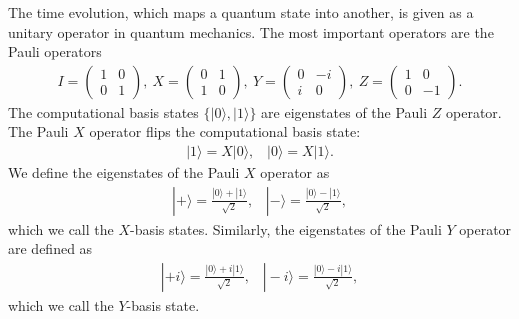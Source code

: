 The time evolution, which maps a quantum state into another, is given as a unitary operator in quantum mechanics.
The most important operators are the Pauli operators
\begin{eqnarray}
I
=
\left(
\begin{array}{cc}
1 & 0
\\
0 & 1
\end{array}
\right),\ 
X
=
\left(
\begin{array}{cc}
0 & 1
\\
1 & 0
\end{array}
\right),\ 
Y
=
\left(
\begin{array}{cc}
0 & -i
\\
i & 0
\end{array}
\right),\ 
Z
=
\left(
\begin{array}{cc}
1 & 0
\\
0 & -1
\end{array}
\right).
\end{eqnarray}
The computational basis states $\{ |0\rangle , |1\rangle\}$ are eigenstates of the Pauli $Z$ operator.
The Pauli $X$ operator flips the computational basis state:
\begin{eqnarray}
|1\rangle = X|0\rangle, \;\;\; |0\rangle = X|1\rangle.
\end{eqnarray}
We define the eigenstates of the Pauli $X$ operator as
\begin{eqnarray}
|+\rangle = \frac{|0\rangle + |1\rangle}{\sqrt{2}},
\;\;\;
|-\rangle = \frac{|0\rangle - |1\rangle}{\sqrt{2}},
\end{eqnarray}
which we call the $X$-basis states.
Similarly, the eigenstates of the Pauli $Y$ operator are defined as 
\begin{eqnarray}
|+i\rangle = \frac{|0\rangle + i|1\rangle}{\sqrt{2}},
\;\;\;
|-i\rangle = \frac{|0\rangle - i|1\rangle}{\sqrt{2}},
\end{eqnarray}
which we call the $Y$-basis state.

